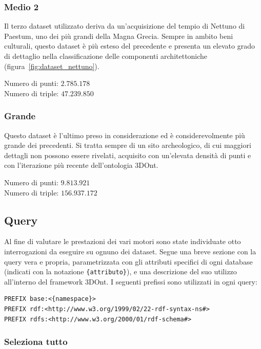 \subsubsection{Medio 2}
\label{ssub:dataset_medio2}

Il terzo dataset utilizzato deriva da un'acquisizione del tempio di Nettuno di Paestum, uno dei più grandi della
Magna Grecia. Sempre in ambito beni culturali, questo dataset è più esteso del precedente e presenta un elevato
grado di dettaglio nella classificazione delle componenti architettoniche
(figura~\ref{fig:dataset_nettuno}).

\noindent Numero di punti: $2.785.178$\\
Numero di triple: $47.239.850$
\subsubsection{Grande}
\label{ssub:dataset_grande}

Questo dataset è l'ultimo preso in considerazione ed è considerevolmente più grande dei precedenti. Si tratta sempre di
un sito archeologico, di cui maggiori dettagli non possono essere rivelati, acquisito con un'elevata densità di punti
e con l'iterazione più recente dell'ontologia 3DOnt.

\noindent Numero di punti: $9.813.921$\\
Numero di triple: $156.937.172$

\subsection{Query}

Al fine di valutare le prestazioni dei vari motori sono state individuate otto interrogazioni da eseguire su ognuno
dei dataset. Segue una breve sezione con la query vera e propria, parametrizzata con gli attributi specifici di ogni
database (indicati con la notazione \texttt{\{attributo\}}), e una descrizione del suo utilizzo all'interno del framework 3DOnt.
I seguenti prefissi sono utilizzati in ogni query: 
\begin{lstlisting}[language=SPARQL]
PREFIX base:<{namespace}>
PREFIX rdf:<http://www.w3.org/1999/02/22-rdf-syntax-ns#>
PREFIX rdfs:<http://www.w3.org/2000/01/rdf-schema#>
\end{lstlisting}

\subsubsection{Seleziona tutto}

